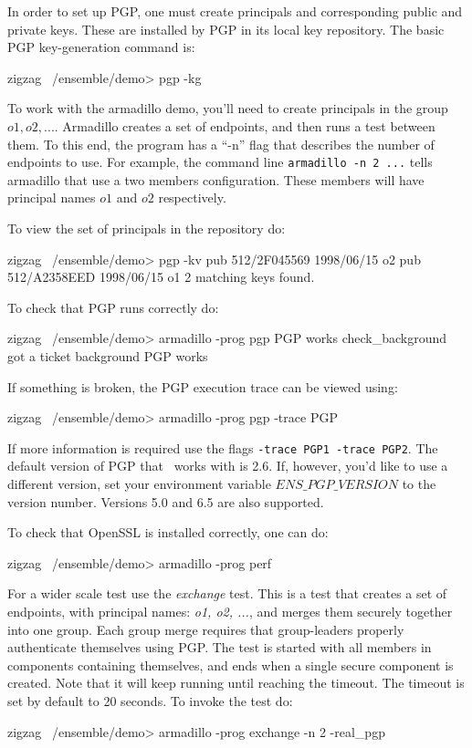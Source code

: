 In order to set up PGP, one must create principals and corresponding
public and private keys. These are installed by PGP in its local
key repository. The basic PGP key-generation command is:
\begin{codebox}
zigzag ~/ensemble/demo> pgp -kg
\end{codebox}

To work with the armadillo demo, you'll need to create principals in
the group $o1, o2, ...$. Armadillo creates a set of endpoints, and
then runs a test between them. To this end, the program has a ``-n''
flag that describes the number of endpoints to use. For example, the
command line {\tt armadillo -n 2 ...} tells armadillo that use a two
members configuration. These members will have principal names $o1$
and $o2$ respectively.

To view the set of principals in the repository do:
\begin{codebox}
zigzag ~/ensemble/demo> pgp -kv
pub   512/2F045569 1998/06/15 o2
pub   512/A2358EED 1998/06/15 o1
2 matching keys found.
\end{codebox}

To check that PGP runs correctly do: 
\begin{codebox}
zigzag ~/ensemble/demo> armadillo -prog pgp 
PGP works
check_background
got a ticket
background PGP works
\end{codebox}

If something is broken, the PGP execution trace can be viewed using:
\begin{codebox}
zigzag ~/ensemble/demo> armadillo -prog pgp  -trace PGP 
\end{codebox}

If more information is required use the flags {\tt -trace PGP1 -trace PGP2}.
The default version of PGP that \ensemble\ works with is 2.6. If,
however, you'd like to use a different version, set your environment
variable $ENS\_PGP\_VERSION$ to the version number. Versions 5.0 and
6.5 are also supported. 

To check that OpenSSL is installed correctly, one can do:
\begin{codebox}
zigzag ~/ensemble/demo> armadillo -prog perf
\end{codebox}

For a wider scale test use the {\it exchange} test. This is a test
that creates a set of endpoints, with principal names: {\it o1, o2,
...}, and merges them securely together into one group. Each group
merge requires that group-leaders properly authenticate themselves
using PGP. The test is started with all members in components containing
themselves, and ends when a single secure component is created. 
Note that it will keep running until reaching the timeout. The timeout
is set by default to 20 seconds. 
To invoke the test do:
\begin{codebox}
zigzag ~/ensemble/demo> armadillo -prog exchange -n 2 -real_pgp
\end{codebox}


